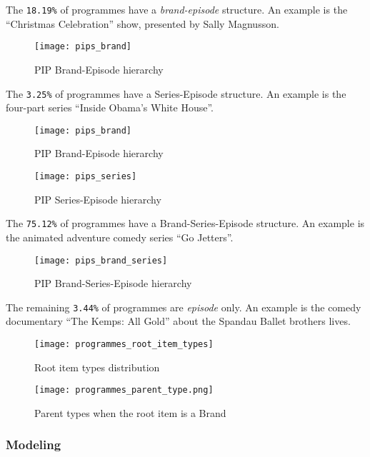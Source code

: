 The \verb|18.19%| of programmes have a \textit{brand-episode} structure.
An example is the ``Christmas Celebration'' show, presented by Sally Magnusson.

\begin{figure}[H]
  \centering
  \texttt{[image: pips\_brand]}
  \caption{PIP Brand-Episode hierarchy}
  \label{fig:pips_brand}
\end{figure}

The \verb|3.25%| of programmes have a Series-Episode structure.
An example is the four-part series ``Inside Obama's White House''.

\begin{figure}[H]
  \centering
  \texttt{[image: pips\_brand]}
  \caption{PIP Brand-Episode hierarchy}
  \label{fig:pips_brand}
\end{figure}

\begin{figure}[H]
  \centering
  \texttt{[image: pips\_series]}
  \caption{PIP Series-Episode hierarchy}
  \label{fig:pips_series}
\end{figure}

The \verb|75.12%| of programmes have a Brand-Series-Episode structure.
An example is the animated adventure comedy series ``Go Jetters''.

\begin{figure}[H]
  \centering
  \texttt{[image: pips\_brand\_series]}
  \caption{PIP Brand-Series-Episode hierarchy}
  \label{fig:pips_brand_series}
\end{figure}

The remaining \verb|3.44%| of programmes are \textit{episode} only.
An example is the comedy documentary ``The Kemps: All Gold'' about the Spandau Ballet brothers lives.

\begin{figure}[H]
  \centering
  \texttt{[image: programmes\_root\_item\_types]}
  \caption{Root item types distribution}
  \label{fig:programmes_root_item_types}
\end{figure}

\begin{figure}[H]
  \centering
  \texttt{[image: programmes\_parent\_type.png]}
  \caption{Parent types when the root item is a Brand}
  \label{fig:programmes_parent_type}
\end{figure}

\subsubsection{Modeling}

